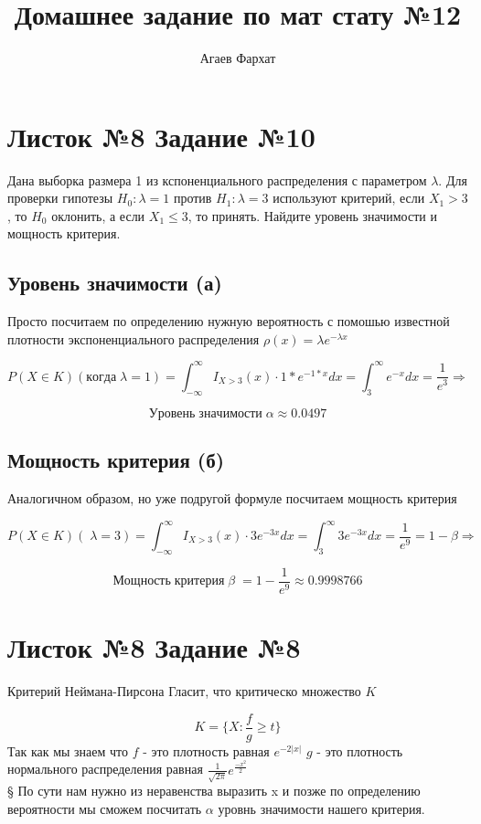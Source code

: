 \documentclass[a4paper, 12pt]{article} %
\author{Агаев Фархат}
\title{Домашнее задание по мат стату №12}
\begin{document}



\section*{Листок №8 Задание №10}
Дана выборка размера 1 из кспоненциального распределения с параметром 
$\lambda$. Для проверки гипотезы $H_0 : \lambda = 1$ против $H_1 : \lambda =3$
используют критерий, если $X_1 > 3$, то $H_0$ оклонить, а если $X_1 \leq 3$, то принять. 
Найдите уровень значимости и мощность критерия.
\subsection*{Уровень значимости (а)}

Просто посчитаем по определению нужную вероятность 
с помошью известной плотности экспоненциального распределения
$\rho(x) = \lambda e^{-\lambda x}$

\[
P(X \in K) (когда \; \lambda = 1) = \int_{-\infty}^{\infty} 
I_{X > 3}(x) \cdot 1 * e^{-1 * x} dx = \int_{3}^{\infty} e^{-x}dx = \frac{1}{e^{3}} \Rightarrow
\]

\[
    Уровень \; значимости \; \alpha \approx 0.0497    
\]

\subsection*{Мощность критерия (б)}
Аналогичном образом, но уже подругой формуле посчитаем мощность критерия

\[
P(X \in K) ( \; \lambda = 3) = \int_{-\infty}^{\infty} 
I_{X > 3}(x) \cdot 3 e^{-3 x} dx = \int_{3}^{\infty} 3e^{-3x}dx = \frac{1}{e^{9}}
= 1 - \beta \Rightarrow 
\]

\[
    Мощность \; критерия \; \beta \; = 1 -  \frac{1}{e^{9}} \approx 0.9998766
\]


\section*{Листок №8 Задание №8}

Критерий Неймана-Пирсона Гласит, что критическо множество $K$ 

\[
    K = \{ X : \frac{f}{g} \geq t\}   
\]
Так как мы знаем что $f$ - это плотность равная $e^{-2|x|}$ 
$g$ - это плотность нормального распределения равная $\frac{1}{\sqrt{2\pi}}e^{\frac{-x^2}{2}}$
\\§
По сути нам нужно из неравенства выразить x и позже по определению вероятности 
мы сможем посчитать $\alpha$ уровнь значимости нашего критерия.
\end{document}
